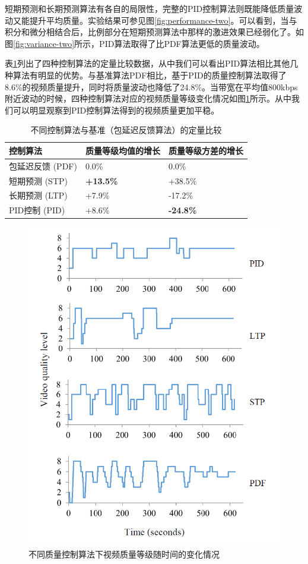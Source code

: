 短期预测和长期预测算法有各自的局限性，完整的PID控制算法则既能降低质量波动又能提升平均质量。实验结果可参见图\ref{fig:performance-two}。可以看到，当与积分和微分相结合后，比例部分在短期预测算法中那样的激进效果已经弱化了。如图\ref{fig:variance-two}所示，PID算法取得了比PDF算法更低的质量波动。

表\ref{tab:improvement}列出了四种控制算法的定量比较数据，从中我们可以看出PID算法相比其他几种算法有明显的优势。与基准算法PDF相比，基于PID的质量控制算法取得了8.6\%的视频质量提升，同时将质量波动也降低了24.8\%。当带宽在平均值800kbps附近波动的时候，四种控制算法对应的视频质量等级变化情况如图\ref{fig:fluctuation}所示。从中我们可以明显观察到PID控制算法得到的视频质量更加平稳。

\begin{table}[h]
\centering
\caption{不同控制算法与基准（包延迟反馈算法）的定量比较}
\label{tab:improvement}
\begin{tabular}[b]{p{4.2cm}<{\centering}|p{4.2cm}<{\centering}|p{4.2cm}<{\centering}}
\hline \hline
控制算法 & 质量等级均值的增长 & 质量等级方差的增长 \\ \hline
包延迟反馈 (PDF) & 0.0\% & 0.0\% \\ \hline
短期预测 (STP) & \textbf{+13.5\%} & +38.5\% \\ \hline
长期预测 (LTP) & +7.9\% & -17.2\% \\ \hline
PID控制 (PID) & +8.6\% & \textbf{-24.8\%} \\ \hline
\end{tabular}
\end{table}

\begin{figure}
\centering
\includegraphics[width = 0.45\linewidth]{figures/Fluctuation.png}
\caption{不同质量控制算法下视频质量等级随时间的变化情况 \label{fig:fluctuation}}
\end{figure}

